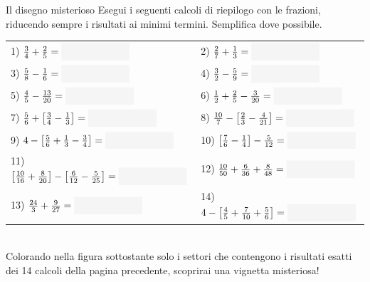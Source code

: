 \condnewpage

\begin{esercizio}{Il disegno misterioso}
Esegui i seguenti calcoli di riepilogo con le frazioni, riducendo sempre i risultati ai minimi termini. Semplifica dove possibile.

\vspace{0.3cm}
\renewcommand{\arraystretch}{2.25}
\begin{tabularx}{\linewidth}{XX}
  1) $\frac{3}{4} + \frac{2}{5} = \fillbox{2.2cm}$ & 2) $\frac{2}{7} + \frac{1}{3} = \fillbox{2.2cm}$ \\
  3) $\frac{5}{8} - \frac{1}{6} = \fillbox{2.2cm}$ & 4) $\frac{3}{2} - \frac{5}{9} = \fillbox{2.2cm}$ \\
  5) $\frac{4}{5} - \frac{13}{20} = \fillbox{2.2cm}$ & 6) $\frac{1}{2} + \frac{2}{5} - \frac{3}{20} = \fillbox{2.2cm}$ \\
  7) $\frac{5}{6} + \left[ \frac{3}{4} - \frac{1}{3} \right] = \fillbox{2.2cm}$ & 8) $\frac{10}{7} - \left[ \frac{2}{3} - \frac{4}{21} \right] = \fillbox{2.2cm}$ \\
  9) $4 - \left[ \frac{5}{6} + \frac{1}{3} - \frac{3}{4} \right] = \fillbox{2.2cm}$ & 10) $\left[ \frac{7}{6} - \frac{1}{4} \right] - \frac{5}{12} = \fillbox{2.2cm}$ \\
  11) $\left[ \frac{10}{16} + \frac{8}{20} \right] - \left[ \frac{6}{12} - \frac{5}{25} \right] = \fillbox{2.2cm}$ & 12) $\frac{10}{50} + \frac{6}{36} + \frac{8}{48} = \fillbox{2.2cm}$ \\
  13) $\frac{24}{3} + \frac{9}{27} = \fillbox{2.2cm}$ & 14) $4 - \left[ \frac{4}{5} + \frac{7}{10} + \frac{5}{6} \right] = \fillbox{2.2cm}$ \\
\end{tabularx}

\condnewpage

\\
Colorando nella figura sottostante solo i settori che contengono i risultati esatti dei 14 calcoli della pagina precedente, scoprirai una vignetta misteriosa!

\vspace{0.5cm}

\responsespace{0.5cm}


\end{esercizio}

